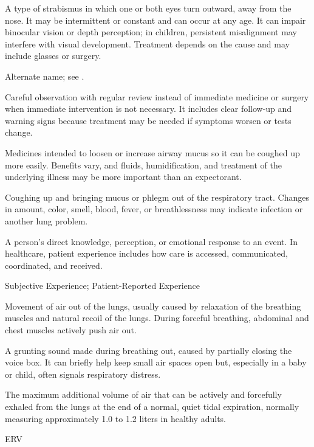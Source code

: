  A type of strabismus in which one or both eyes turn outward, away from the nose. It may be intermittent or constant and can occur at any age. It can impair binocular vision or depth perception; in children, persistent misalignment may interfere with visual development. Treatment depends on the cause and may include glasses or surgery.

 Alternate name; see .

 Careful observation with regular review instead of immediate medicine or surgery when immediate intervention is not necessary. It includes clear follow-up and warning signs because treatment may be needed if symptoms worsen or tests change.

 Medicines intended to loosen or increase airway mucus so it can be coughed up more easily. Benefits vary, and fluids, humidification, and treatment of the underlying illness may be more important than an expectorant.

 Coughing up and bringing mucus or phlegm out of the respiratory tract. Changes in amount, color, smell, blood, fever, or breathlessness may indicate infection or another lung problem.

 A person’s direct knowledge, perception, or emotional response to an event. In healthcare, patient experience includes how care is accessed, communicated, coordinated, and received.

\synonyms
Subjective Experience; Patient-Reported Experience

 Movement of air out of the lungs, usually caused by relaxation of the breathing muscles and natural recoil of the lungs. During forceful breathing, abdominal and chest muscles actively push air out.

 A grunting sound made during breathing out, caused by partially closing the voice box. It can briefly help keep small air spaces open but, especially in a baby or child, often signals respiratory distress.

 The maximum additional volume of air that can be actively and forcefully exhaled from the lungs at the end of a normal, quiet tidal expiration, normally measuring approximately 1.0 to 1.2 liters in healthy adults.

\synonyms
ERV

